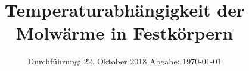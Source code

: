 

\subject{V 47}
\title{Temperaturabhängigkeit der Molwärme in Festkörpern}
\date{
  Durchführung: 22. Oktober 2018
  \hspace{3em}
  Abgabe: \today
}



\maketitle
\thispagestyle{empty}
\tableofcontents
\newpage






\printbibliography



